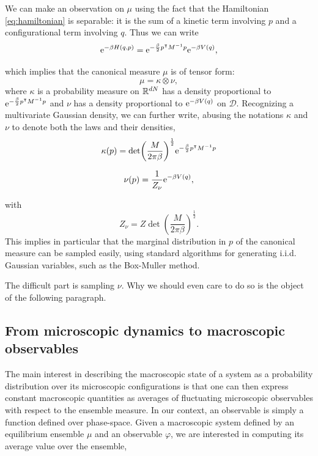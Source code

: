 \begin{remark}
We can make an observation on $\mu$ using the fact that the Hamiltonian \ref{eq:hamiltonian} is separable: it is the sum of a kinetic term involving $p$ and a configurational term involving $q$. Thus we can write
$$\mathrm{e}^{-\beta H(q,p)}=\mathrm{e}^{-\frac\beta 2p^\intercal M^{-1}p}\mathrm{e}^{-\beta V(q)},$$


which implies that the canonical measure $\mu$ is of tensor form: 
\begin{equation}\label{eq:tensor_form}\mu = \kappa \otimes \nu, \end{equation}
where $\kappa$ is a probability measure on $\mathbb{R}^{dN}$ has a density proportional to $\mathrm{e}^{-\frac\beta 2p^\intercal M^{-1}p}$ and $\nu$ has a density proportional to $\mathrm{e}^{-\beta V(q)}$ on $\mathcal D$.
Recognizing a multivariate Gaussian density, we can further write, abusing the notations $\kappa$ and $\nu$ to denote both the laws and their densities,
\begin{equation}
    \label{eq:kappa_marginal}
    \kappa(p)=\det(\frac{M}{2\pi\beta})^{\frac 12}\mathrm{e}^{-\frac\beta2p^\intercal M^{-1}p}
\end{equation}

\begin{equation}
    \label{eq:nu_marginal}
    \nu(p)=\frac1{Z_\nu}\mathrm{e}^{-\beta V(q)},
\end{equation}

with $$ Z_\nu= Z\det(\frac{M}{2\pi\beta})^{\frac 12}.$$
This implies in particular that the marginal distribution in $p$ of the canonical measure can be sampled easily, using standard algorithms for generating i.i.d. Gaussian variables, such as the Box-Muller method.
\end{remark}

The difficult part is sampling $\nu$. Why we should even care to do so is the object of the following paragraph.

\subsection{From microscopic dynamics to macroscopic observables}
The main interest in describing the macroscopic state of a system as a probability distribution over its microscopic configurations is that one can then express constant macroscopic quantities as averages of fluctuating microscopic observables with respect to the ensemble measure.
In our context, an observable is simply a function defined over phase-space. Given a macroscopic system defined by an equilibrium ensemble $\mu$ and an observable $\varphi$, we are interested in computing its average value over the ensemble,

